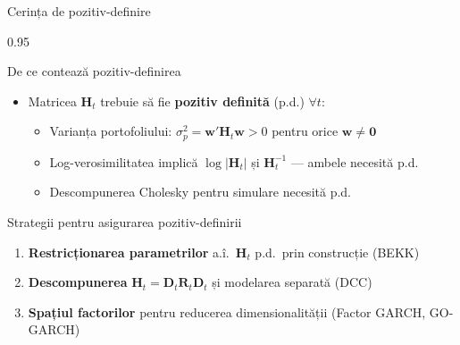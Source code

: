 \documentclass[9pt, aspectratio=169, t]{beamer}
\begin{document}
\begin{frame}{Cerința de pozitiv-definire}
    \begin{cminipage}{0.95\textwidth}
    {\footnotesize
    \begin{block}{De ce contează pozitiv-definirea}
        \begin{itemize}\setlength{\itemsep}{0pt}
            \item Matricea $\mathbf{H}_t$ trebuie să fie \textbf{pozitiv definită} (p.d.) $\forall t$:
                \begin{itemize}\setlength{\itemsep}{0pt}
                    \item Varianța portofoliului: $\sigma_p^2 = \mathbf{w}'\mathbf{H}_t\mathbf{w} > 0$ pentru orice $\mathbf{w} \neq \mathbf{0}$
                    \item Log-verosimilitatea implică $\log|\mathbf{H}_t|$ și $\mathbf{H}_t^{-1}$ --- ambele necesită p.d.
                    \item Descompunerea Cholesky pentru simulare necesită p.d.
                \end{itemize}
        \end{itemize}
    \end{block}
    \begin{block}{Strategii pentru asigurarea pozitiv-definirii}
        \begin{enumerate}\setlength{\itemsep}{0pt}
            \item \textbf{Restricționarea parametrilor} a.î.\ $\mathbf{H}_t$ p.d.\ prin construcție (BEKK)
            \item \textbf{Descompunerea} $\mathbf{H}_t = \mathbf{D}_t \mathbf{R}_t \mathbf{D}_t$ și modelarea separată (DCC)
            \item \textbf{Spațiul factorilor} pentru reducerea dimensionalității (Factor GARCH, GO-GARCH)
        \end{enumerate}
    \end{block}
    }
    \end{cminipage}
\end{frame}
\end{document}
